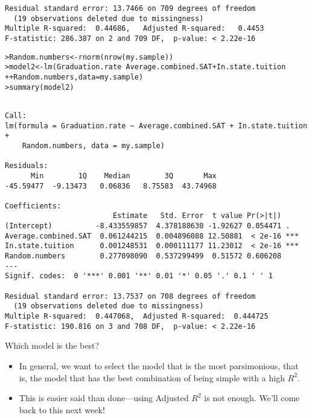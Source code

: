 \documentclass{beamer}\usepackage[]{graphicx}\usepackage[]{color}
\makeatletter
\newcommand{\hlopt}[1]{\textcolor[rgb]{1,0.894,0.769}{#1}}%
\newcommand{\hlstd}[1]{\textcolor[rgb]{1,0.894,0.769}{#1}}%
\newcommand{\hlkwb}[1]{\textcolor[rgb]{0.804,0.776,0.451}{#1}}%
\newcommand{\hlkwc}[1]{\textcolor[rgb]{0.78,0.941,0.545}{#1}}%
\newcommand{\hlkwd}[1]{\textcolor[rgb]{1,0.78,0.769}{#1}}%
\newenvironment{kframe}{%
 \def\at@end@of@kframe{}%
 \ifinner\ifhmode%
  \def\at@end@of@kframe{\end{minipage}}%
  \begin{minipage}{\columnwidth}%
 \fi\fi%
 \def\FrameCommand##1{\hskip\@totalleftmargin \hskip-\fboxsep
 \colorbox{shadecolor}{##1}\hskip-\fboxsep
     \hskip-\linewidth \hskip-\@totalleftmargin \hskip\columnwidth}%
 \MakeFramed {\advance\hsize-\width
   \@totalleftmargin\z@ \linewidth\hsize
   \@setminipage}}%
 {\par\unskip\endMakeFramed%
 \at@end@of@kframe}
\newenvironment{knitrout}{}{} %
\makeatother
\begin{document}
\begin{darkframes}
\begin{frame}[fragile]
\begin{knitrout}
\begin{kframe}
\begin{verbatim}
Residual standard error: 13.7466 on 709 degrees of freedom
  (19 observations deleted due to missingness)
Multiple R-squared:  0.44686,	Adjusted R-squared:   0.4453 
F-statistic: 286.387 on 2 and 709 DF,  p-value: < 2.22e-16
\end{verbatim}
\end{kframe}
\end{knitrout}
    \end{frame}

    \begin{frame}[fragile]
      \fontsize{8}{8}
\begin{knitrout}
\begin{kframe}
\begin{alltt}
\hlstd{> }\hlstd{Random.numbers} \hlkwb{<-} \hlkwd{rnorm}\hlstd{(}\hlkwd{nrow}\hlstd{(my.sample))}
\hlstd{> }\hlstd{model2} \hlkwb{<-} \hlkwd{lm}\hlstd{(Graduation.rate} \hlopt{~} \hlstd{Average.combined.SAT} \hlopt{+} \hlstd{In.state.tuition}
\hlstd{+ }               \hlopt{+} \hlstd{Random.numbers,} \hlkwc{data}\hlstd{=my.sample)}
\hlstd{> }\hlkwd{summary}\hlstd{(model2)}
\end{alltt}
\begin{verbatim}

Call:
lm(formula = Graduation.rate ~ Average.combined.SAT + In.state.tuition + 
    Random.numbers, data = my.sample)

Residuals:
      Min        1Q    Median        3Q       Max 
-45.59477  -9.13473   0.06836   8.75583  43.74968 

Coefficients:
                         Estimate   Std. Error  t value Pr(>|t|)    
(Intercept)          -8.433559857  4.378188630 -1.92627 0.054471 .  
Average.combined.SAT  0.061244215  0.004896088 12.50881  < 2e-16 ***
In.state.tuition      0.001248531  0.000111177 11.23012  < 2e-16 ***
Random.numbers        0.277098090  0.537299499  0.51572 0.606208    
---
Signif. codes:  0 '***' 0.001 '**' 0.01 '*' 0.05 '.' 0.1 ' ' 1

Residual standard error: 13.7537 on 708 degrees of freedom
  (19 observations deleted due to missingness)
Multiple R-squared:  0.447068,	Adjusted R-squared:  0.444725 
F-statistic: 190.816 on 3 and 708 DF,  p-value: < 2.22e-16
\end{verbatim}
\end{kframe}
\end{knitrout}
    \end{frame}

    \begin{frame}{Which model is the best?}
      \begin{itemize}[<+->]
        \item In general, we want to select the model that is the most \alert{parsimonious}, that is, the model that has the best combination of being simple with a high $R^2$.
        \item This is easier said than done---using Adjusted $R^2$ is not enough. We'll come back to this next week!
      \end{itemize}
    \end{frame}
  \end{darkframes}
\end{document}
